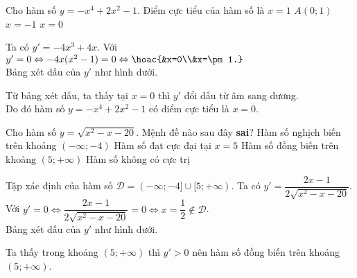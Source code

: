 \begin{ex}%
 Cho hàm số $y=-x^4+2x^2-1$. Điểm cực tiểu của hàm số là
 \choice
 {$x=1$}
 {$A(0;1)$}
 {$x=-1$}
 {$x=0$}
 \loigiai
 {
 Ta có $y'=-4x^3+4x$. Với $y'=0\Leftrightarrow -4x(x^2-1)=0\Leftrightarrow\hoac{&x=0\\&x=\pm1.}$\\
 Bảng xét dấu của $y'$ như hình dưới.
 \begin{center}
 \end{center}
 Từ bảng xét dấu, ta thấy tại $x=0$ thì $y'$ đổi dấu từ âm sang dương.\\
 Do đó hàm số $y=-x^4+2x^2-1$ có điểm cực tiểu là $x=0$.
 }
\end{ex}
\begin{ex}%
 Cho hàm số $y=\sqrt{x^2-x-20}$. Mệnh đề nào sau đây \textbf{sai}?
 \choice
 {Hàm số nghịch biến trên khoảng $(-\infty;-4)$}
 {Hàm số đạt cực đại tại $x=5$}
 {\True Hàm số đồng biến trên khoảng $(5;+\infty)$}
 {Hàm số không có cực trị}
 \loigiai
 {
 Tập xác định của hàm số $\mathscr{D}=(-\infty;-4]\cup[5;+\infty)$. Ta có $y'=\dfrac{2x-1}{2\sqrt{x^2-x-20}}$.\\
 Với $y'=0\Leftrightarrow \dfrac{2x-1}{2\sqrt{x^2-x-20}}=0\Leftrightarrow x=\dfrac{1}{2}\not\in\mathscr{D}$.\\
 Bảng xét dấu của $y'$ như hình dưới.
 \begin{center}
 \end{center}
 Ta thấy trong khoảng $(5;+\infty)$ thì $y'>0$ nên hàm số đồng biến trên khoảng $(5;+\infty)$.
 }
\end{ex}
